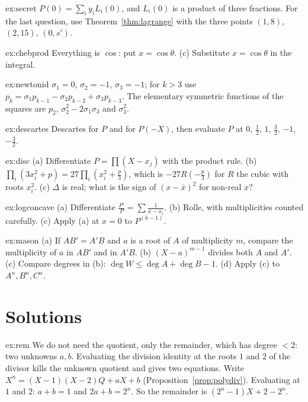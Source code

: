 \begin{hint}{ex:secret}
$P(0)=\sum_iy_iL_i(0)$, and $L_i(0)$ is a product of three fractions. For the last question, use Theorem~\ref{thm:lagrange} with the three points $(1,8)$, $(2,15)$, $(0,s')$.
\end{hint}
\begin{hint}{ex:chebprod}
Everything is $\cos$: put $x=\cos\theta$. (c) Substitute $x=\cos\theta$ in the integral.
\end{hint}
\begin{hint}{ex:newtonid}
$\sigma_1=0$, $\sigma_2=-1$, $\sigma_3=-1$; for $k>3$ use $p_k=\sigma_1p_{k-1}-\sigma_2p_{k-2}+\sigma_3p_{k-3}$. The elementary symmetric functions of the squares are $p_2$, $\sigma_2^2-2\sigma_1\sigma_3$ and $\sigma_3^2$.
\end{hint}
\begin{hint}{ex:descartes}
Descartes for $P$ and for $P(-X)$, then evaluate $P$ at $0$, $\frac12$, $1$, $\frac32$, $-1$, $-\frac32$.
\end{hint}
\begin{hint}{ex:disc}
(a) Differentiate $P=\prod(X-x_j)$ with the product rule. (b) $\prod_i(3x_i^2+p)=27\prod_i(x_i^2+\frac p3)$, which is $-27R(-\frac p3)$ for $R$ the cubic with roots $x_i^2$. (c) $\Delta$ is real; what is the sign of $(x-\bar x)^2$ for non-real $x$?
\end{hint}
\begin{hint}{ex:logconcave}
(a) Differentiate $\frac{P'}P=\sum\frac1{x-x_i}$. (b) Rolle, with multiplicities counted carefully. (c) Apply (a) at $x=0$ to $P^{(k-1)}$.
\end{hint}
\begin{hint}{ex:mason}
(a) If $AB'=A'B$ and $a$ is a root of $A$ of multiplicity $m$, compare the multiplicity of $a$ in $AB'$ and in $A'B$. (b) $(X-a)^{m-1}$ divides both $A$ and $A'$. (c) Compare degrees in (b): $\deg W\le\deg A+\deg B-1$. (d) Apply (c) to $A^n,B^n,C^n$.
\end{hint}

\section{Solutions}

\begin{solution}{ex:rem}
\idea We do not need the quotient, only the remainder, which has degree $<2$: two unknowns $a,b$. Evaluating the division identity at the roots $1$ and $2$ of the divisor kills the unknown quotient and gives two equations.
\writeup Write $X^n=(X-1)(X-2)Q+aX+b$ (Proposition~\ref{prop:polydiv}). Evaluating at $1$ and $2$: $a+b=1$ and $2a+b=2^n$. So the remainder is $(2^n-1)X+2-2^n$.
\end{solution}

